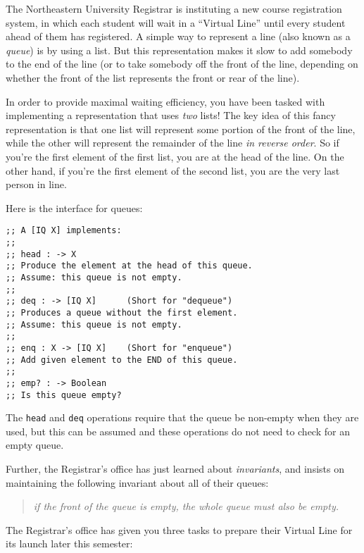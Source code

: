 \documentclass[12pt]{article}                   %
\def\pts#1{\marginpar{\footnotesize \raggedright  \fbox{#1 {\sc Points}}}}
\newcommand\code[1]{\texttt{#1}}
\begin{document}
\begin{problem} \pts{6}

The Northeastern University Registrar is instituting a new course
registration system, in which each student will wait in a ``Virtual
Line'' until every student ahead of them has registered.  A simple way
to represent a line (also known as a \emph{queue}) is by using a list.
But this representation makes it slow to add somebody to the end of
the line (or to take somebody off the front of the line, depending on
whether the front of the list represents the front or rear of the
line).  

In order to provide maximal waiting efficiency, you have been tasked
with implementing a representation that uses \emph{two} lists!  The
key idea of this fancy representation is that one list will represent
some portion of the front of the line, while the other will represent
the remainder of the line \emph{in reverse order}.  So if you're the
first element of the first list, you are at the head of the line.  On
the other hand, if you're the first element of the second list, you
are the very last person in line.

Here is the interface for queues:
\begin{verbatim}
;; A [IQ X] implements:
;;
;; head : -> X
;; Produce the element at the head of this queue.
;; Assume: this queue is not empty.
;;
;; deq : -> [IQ X]      (Short for "dequeue")
;; Produces a queue without the first element.
;; Assume: this queue is not empty.
;;
;; enq : X -> [IQ X]    (Short for "enqueue")
;; Add given element to the END of this queue.
;;
;; emp? : -> Boolean
;; Is this queue empty?
\end{verbatim}

The \code{head} and \code{deq} operations require that the queue be
non-empty when they are used, but this can be assumed and these
operations do not need to check for an empty queue.

Further, the Registrar's office has just learned about
\emph{invariants}, and insists on maintaining the following invariant
about all of their queues:

\begin{quote}
  {\it if the front of the queue is empty, the whole queue must also be empty.}
\end{quote} 

\noindent
The Registrar's office has given you three tasks to prepare their
Virtual Line for its launch later this semester:


\end{problem}
\end{document}
